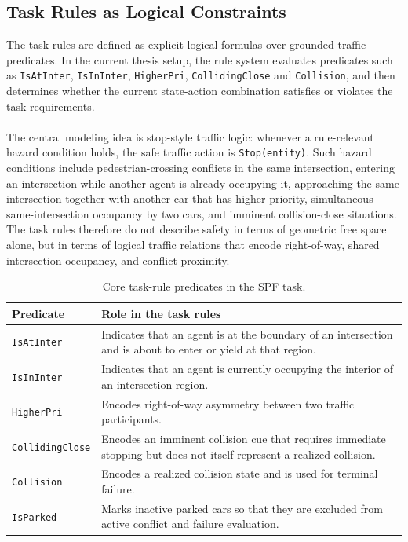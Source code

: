 \subsection{Task Rules as Logical Constraints}
The task rules are defined as explicit logical formulas over grounded traffic predicates. In the current thesis setup, the rule system evaluates predicates such as \texttt{IsAtInter}, \texttt{IsInInter}, \texttt{HigherPri}, \texttt{CollidingClose} and \texttt{Collision}, and then determines whether the current state-action combination satisfies or violates the task requirements.
\\
\\
The central modeling idea is stop-style traffic logic: whenever a rule-relevant hazard condition holds, the safe traffic action is \texttt{Stop(entity)}. Such hazard conditions include pedestrian-crossing conflicts in the same intersection, entering an intersection while another agent is already occupying it, approaching the same intersection together with another car that has higher priority, simultaneous same-intersection occupancy by two cars, and imminent collision-close situations. The task rules therefore do not describe safety in terms of geometric free space alone, but in terms of logical traffic relations that encode right-of-way, shared intersection occupancy, and conflict proximity.

\begin{table}[H]
\centering
\small
\caption{Core task-rule predicates in the SPF task.}
\label{tab:task-rule-predicates}
\begin{tabularx}{\linewidth}{@{}l X@{}}
\toprule
\textbf{Predicate} & \textbf{Role in the task rules} \\
\midrule
\texttt{IsAtInter} & Indicates that an agent is at the boundary of an intersection and is about to enter or yield at that region. \\
\texttt{IsInInter} & Indicates that an agent is currently occupying the interior of an intersection region. \\
\texttt{HigherPri} & Encodes right-of-way asymmetry between two traffic participants. \\
\texttt{CollidingClose} & Encodes an imminent collision cue that requires immediate stopping but does not itself represent a realized collision. \\
\texttt{Collision} & Encodes a realized collision state and is used for terminal failure. \\
\texttt{IsParked} & Marks inactive parked cars so that they are excluded from active conflict and failure evaluation. \\
\bottomrule
\end{tabularx}
\end{table}

